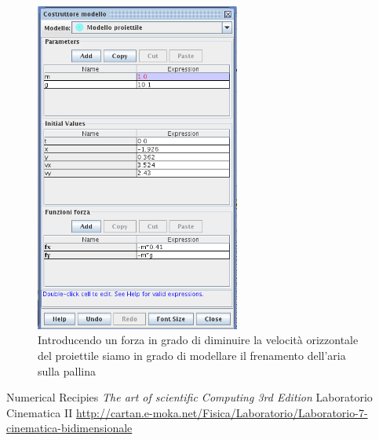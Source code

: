\documentclass[a4paper,10pt,oneside]{article}
\begin{document}
\begin{figure}[H]
 \centering
 \includegraphics[width=0.6\textwidth]{./immagini/tracker_model_builder2.png}
 \caption{Introducendo un forza in grado di diminuire la velocità orizzontale del proiettile siamo in grado di modellare il frenamento dell'aria sulla pallina}
 \label{fig:model_builder2}
\end{figure}



\begin{thebibliography}{9}
 Numerical Recipies \emph{The art of scientific Computing  3rd Edition}
 Laboratorio Cinematica II \url{http://cartan.e-moka.net/Fisica/Laboratorio/Laboratorio-7-cinematica-bidimensionale}
\end{thebibliography}
\end{document}
